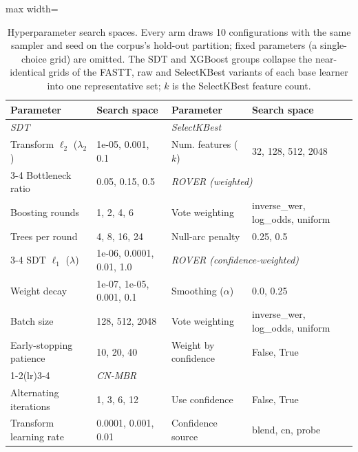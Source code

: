 \begin{table}[t]
    \centering
    \caption{Hyperparameter search spaces. Every arm draws 10 configurations with the same sampler and seed on the corpus's hold-out partition; fixed parameters (a single-choice grid) are omitted. The SDT and XGBoost groups collapse the near-identical grids of the FASTT, raw and SelectKBest variants of each base learner into one representative set; $k$ is the SelectKBest feature count.}
    \label{tab:spaces} \footnotesize \setlength{\tabcolsep}{3pt}
    \begin{adjustbox}{max width=\linewidth}
    \begin{tabular}{ll@{\hspace{2em}}ll}
        \toprule
        \textbf{Parameter} & \textbf{Search space} & \textbf{Parameter} & \textbf{Search space} \\
        \midrule
        \multicolumn{2}{l}{\textit{SDT}} & \multicolumn{2}{l}{\textit{SelectKBest}} \\
        Transform $\ell_2$ ($\lambda_2$) & {1e-05, 0.001, 0.1} & Num. features ($k$) & {32, 128, 512, 2048} \\
        \cmidrule(lr){3-4}
        Bottleneck ratio & {0.05, 0.15, 0.5} & \multicolumn{2}{l}{\textit{ROVER (weighted)}} \\
        Boosting rounds & {1, 2, 4, 6} & Vote weighting & {inverse\_wer, log\_odds, uniform} \\
        Trees per round & {4, 8, 16, 24} & Null-arc penalty & {0.25, 0.5} \\
        \cmidrule(lr){3-4}
        SDT $\ell_1$ ($\lambda$) & {1e-06, 0.0001, 0.01, 1.0} & \multicolumn{2}{l}{\textit{ROVER (confidence-weighted)}} \\
        Weight decay & {1e-07, 1e-05, 0.001, 0.1} & Smoothing ($\alpha$) & {0.0, 0.25} \\
        Batch size & {128, 512, 2048} & Vote weighting & {inverse\_wer, log\_odds, uniform} \\
        Early-stopping patience & {10, 20, 40} & Weight by confidence & {False, True} \\
        \cmidrule(lr){1-2}\cmidrule(lr){3-4}
        \multicolumn{2}{l}{\textit{XGBoost}} & \multicolumn{2}{l}{\textit{CN-MBR}} \\
        Alternating iterations & {1, 3, 6, 12} & Use confidence & {False, True} \\
        Transform learning rate & {0.0001, 0.001, 0.01} & Confidence source & {blend, cn, probe} \\

\end{tabular}
\end{adjustbox}
\end{table}
